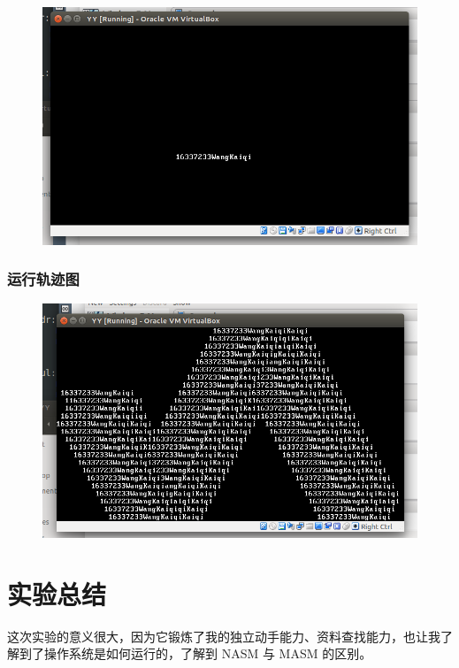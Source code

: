 \documentclass{article}
\begin{document}
\begin{figure}[!hbp]
	\centering
	\includegraphics[scale=0.5]{pics/5.png}
\end{figure}

\subsubsection{运行轨迹图}

\begin{figure}[!hbp]
	\centering
	\includegraphics[scale=0.5]{pics/6.png}
\end{figure}

\section{实验总结}

这次实验的意义很大，因为它锻炼了我的独立动手能力、资料查找能力，也让我了解到了操作系统是如何运行的，了解到 NASM 与 MASM 的区别。
\end{document}
